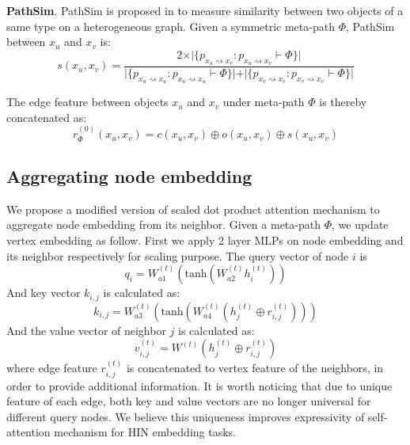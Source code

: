 \noindent{\small$\bullet$}\textbf{PathSim}. 
PathSim is proposed in \citep{SunHYYW11} to measure similarity between two objects of a same type on a heterogeneous graph. Given a symmetric meta-path $\Phi$, PathSim between $x_u$ and $x_v$ is:
\begin{equation*}
s(x_u,x_v) = \frac{2\times\vert\{ p_{x_u \rightsquigarrow x_v}:p_{x_u \rightsquigarrow x_v} \vdash \Phi \}\vert}{\vert\{ p_{x_u \rightsquigarrow x_u}:p_{x_u \rightsquigarrow x_u} \vdash \Phi \}\vert +\vert\{ p_{x_v \rightsquigarrow x_v}:p_{x_v \rightsquigarrow x_v} \vdash \Phi \}\vert }
\end{equation*}

The edge feature between objects $x_u$ and $x_v$ under meta-path $\Phi$ is thereby concatenated as:
\begin{equation}
\label{eq:edge}
r^{(0)}_\Phi(x_u,x_v) = c(x_u,x_v)\oplus o(x_u,x_v)\oplus s(x_u,x_v)
\end{equation}

\subsection{Aggregating node embedding}
We propose a modified version of scaled dot product attention mechanism to aggregate node embedding from its neighbor. Given a meta-path $\Phi$, we update vertex embedding as follow. First we apply 2 layer MLPs on node embedding and its neighbor respectively for scaling purpose. The query vector of node $i$ is
\begin{equation}
q_i= W_{a1}^{(t)}(\text{tanh}(W_{a2}^{(t)}h^{(t)}_i ))
\end{equation}
And key vector $k_{i,j}$ is calculated as:
\begin{equation}
k_{i,j} = W_{a3}^{(t)}(\text{tanh}(W_{a4}^{(t)}(h^{(t)}_j \oplus r^{(t)}_{i,j}) ))
\end{equation}
And the value vector of neighbor $j$ is calculated as: 
\begin{equation}
\label{eq:value}
v^{(t)}_{i,j} = W^{(t)}( h^{(t)}_j \oplus r^{(t)}_{i,j} )
\end{equation} 
where edge feature $r^{(t)}_{i,j}$ is concatenated to vertex feature of the neighbors, in order to provide additional information. It is worth noticing that due to unique feature of each edge, both key and value vectors are no longer universal for different query nodes. We believe this uniqueness improves expressivity of self-attention mechanism for HIN embedding tasks.

